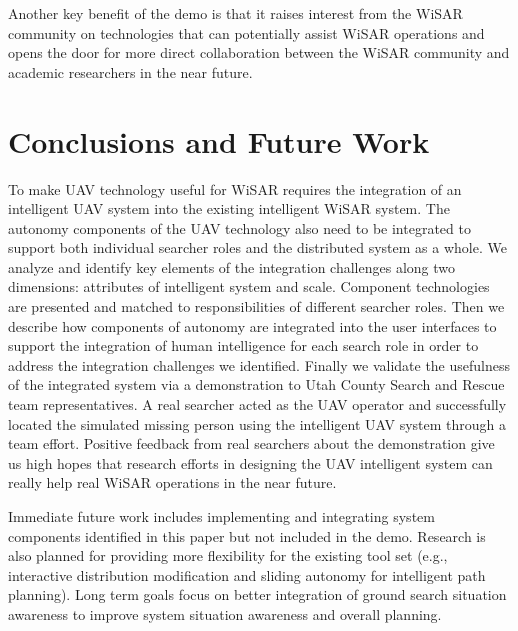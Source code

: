 Another key benefit of the demo is that it raises interest from the WiSAR community on technologies that can potentially assist WiSAR operations and opens the door for more direct collaboration between the WiSAR community and academic researchers in the near future.

\section{Conclusions and Future Work}

To make UAV technology useful for WiSAR requires the integration of an intelligent UAV system into the existing intelligent WiSAR system. The autonomy components of the UAV technology also need to be integrated to support both individual searcher roles and the distributed system as a whole. We analyze and identify key elements of the integration challenges along two dimensions: attributes of intelligent system and scale. Component technologies are presented and matched to responsibilities of different searcher roles. Then we describe how components of autonomy are integrated into the user interfaces to support the integration of human intelligence for each search role in order to address the integration challenges we identified. Finally we validate the usefulness of the integrated system via a demonstration to Utah County Search and Rescue team representatives. A real searcher acted as the UAV operator and successfully located the simulated missing person using the intelligent UAV system through a team effort. Positive feedback from real searchers about the demonstration give us high hopes that research efforts in designing the UAV intelligent system can really help real WiSAR operations in the near future.

Immediate future work includes implementing and integrating system components identified in this paper but not included in the demo. Research is also planned for providing more flexibility for the existing tool set (e.g., interactive distribution modification and sliding autonomy for intelligent path planning). Long term goals focus on better integration of ground search situation awareness to improve system situation awareness and overall planning.
